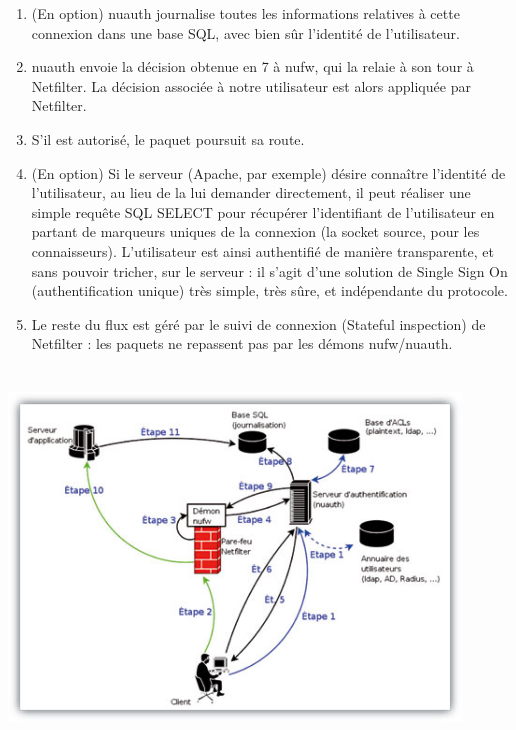 \documentclass[12pt]{report}
\begin{document}
\begin{itemize}
\begin{enumerate}
  \item (En option) nuauth journalise toutes les informations relatives à cette connexion dans une base SQL, avec bien sûr l’identité de l’utilisateur.
  \\
  \item nuauth envoie la décision obtenue en 7 à nufw, qui la relaie à son tour à Netfilter. La décision associée à notre utilisateur est alors appliquée par Netfilter.
  \\
  \item S’il est autorisé, le paquet poursuit sa route.
  \\
  \item (En option) Si le serveur (Apache, par exemple) désire connaître l’identité de l’utilisateur, au lieu de la lui demander directement, il peut réaliser une simple requête SQL SELECT pour récupérer l’identifiant de l’utilisateur en partant de marqueurs uniques de la connexion (la socket source, pour les connaisseurs). L’utilisateur est ainsi authentifié de manière transparente, et sans pouvoir tricher, sur le serveur : il s’agit d’une solution de Single Sign On (authentification unique) très simple, très sûre, et indépendante du protocole.
  \\
  \item Le reste du flux est géré par le suivi de connexion (Stateful inspection) de Netfilter : les paquets ne repassent pas par les démons nufw/nuauth.
\end{enumerate}
\begin{center}
  \includegraphics[width=12cm,height=10cm]{images/algo.jpg}
\end{center}


\end{itemize}
\end{document}
